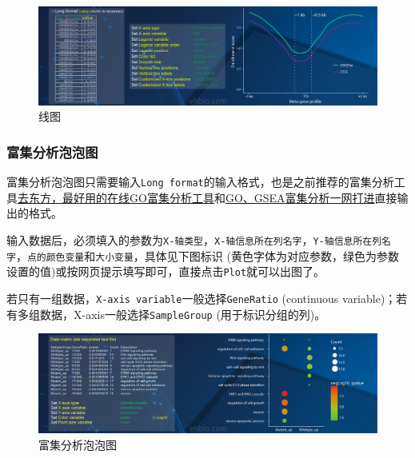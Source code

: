 \documentclass[]{article}
\numberwithin{figure}{section}
\numberwithin{table}{section}
\theoremstyle{definition}
\theoremstyle{definition}
\theoremstyle{definition}
\theoremstyle{remark}
\begin{document}
\begin{figure}[H]

{\centering \includegraphics[width=0.95\linewidth,height=0.7\textheight,keepaspectratio]{images/Line_4} 

}

\caption{线图}\label{fig:unnamed-chunk-247}
\end{figure}

\subsubsection{富集分析泡泡图}

富集分析泡泡图只需要输入\texttt{Long\ format}的输入格式，也是之前推荐的富集分析工具\href{https://mp.weixin.qq.com/s/l6j2encDfEQkt2UeNCMFhg}{去东方，最好用的在线GO富集分析工具}和\href{https://mp.weixin.qq.com/s/d1KCETQZ88yaOLGwAtpWYg}{GO、GSEA富集分析一网打进}直接输出的格式。

输入数据后，必须填入的参数为\texttt{X-轴类型}，\texttt{X-轴信息所在列名字}，\texttt{Y-轴信息所在列名字}，\texttt{点的颜色变量}和\texttt{大小变量}，具体见下图标识
(黄色字体为对应参数，绿色为参数设置的值)或按网页提示填写即可，直接点击\texttt{Plot}就可以出图了。

若只有一组数据，\texttt{X-axis\ variable}一般选择\texttt{GeneRatio}
(continuous variable)；若有多组数据，X-axis一般选择\texttt{SampleGroup}
(用于标识分组的列)。

\begin{figure}[H]

{\centering \includegraphics[width=0.95\linewidth,height=0.7\textheight,keepaspectratio]{images/GO_1} 

}

\caption{富集分析泡泡图}\label{fig:unnamed-chunk-248}
\end{figure}
\end{document}
